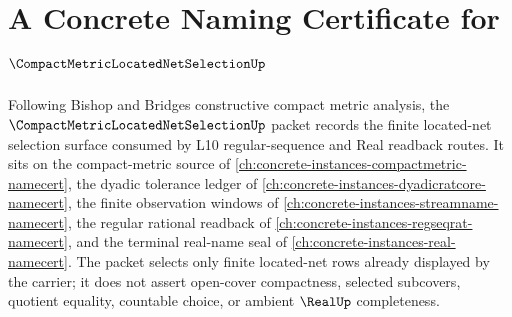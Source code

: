 \chapter{A Concrete Naming Certificate for $\CompactMetricLocatedNetSelectionUp$}
\label{ch:concrete-instances-compact-metric-located-net-selection-namecert}

Following Bishop and Bridges constructive compact metric analysis, the $\CompactMetricLocatedNetSelectionUp$ packet records the finite located-net selection surface consumed by L10 regular-sequence and Real readback routes. It sits on the compact-metric source of \autoref{ch:concrete-instances-compactmetric-namecert}, the dyadic tolerance ledger of \autoref{ch:concrete-instances-dyadicratcore-namecert}, the finite observation windows of \autoref{ch:concrete-instances-streamname-namecert}, the regular rational readback of \autoref{ch:concrete-instances-regseqrat-namecert}, and the terminal real-name seal of \autoref{ch:concrete-instances-real-namecert}. The packet selects only finite located-net rows already displayed by the carrier; it does not assert open-cover compactness, selected subcovers, quotient equality, countable choice, or ambient $\RealUp$ completeness.

